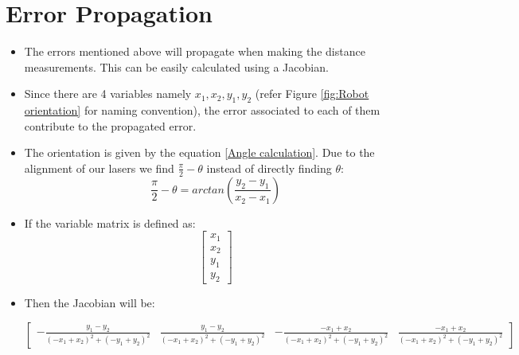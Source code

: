     \section{Error Propagation}
    {
        \begin{itemize}
            \item The errors mentioned above will propagate when making the distance measurements. This can be easily calculated using a Jacobian.
            
            \item Since there are 4 variables namely $x_1,x_2,y_1,y_2$ (refer Figure \ref{fig:Robot orientation} for naming convention), the error associated to each of them contribute to the propagated error.
            
            \item The orientation is given by the equation \ref{Angle calculation}. Due to the alignment of our lasers we find $\frac{\pi}{2}-\theta$ instead of directly finding $\theta$:
            \begin{equation}\label{Angle calculation}
                \frac{\pi}{2}-\theta=arctan(\frac{y_2-y_1}{x_2-x_1})
            \end{equation}
            
            \item If the variable matrix is defined as:
            \begin{equation}\label{Variable Matrix}
                \begin{bmatrix}x_{1}\\x_{2}\\y_{1}\\y_{2}\end{bmatrix}
            \end{equation}
            
            \item Then the Jacobian will be:
          
            
            
           $$ \begin{bmatrix}\label{Jacobian}- \frac{y_{1} - y_{2}}{\left(- x_{1} + x_{2}\right)^{2} + \left(- y_{1} + y_{2}\right)^{2}} & \frac{y_{1} - y_{2}}{\left(- x_{1} + x_{2}\right)^{2} + \left(- y_{1} + y_{2}\right)^{2}} & - \frac{- x_{1} + x_{2}}{\left(- x_{1} + x_{2}\right)^{2} + \left(- y_{1} + y_{2}\right)^{2}} & \frac{- x_{1} + x_{2}}{\left(- x_{1} + x_{2}\right)^{2} + \left(- y_{1} + y_{2}\right)^{2}}\end{bmatrix}
           $$
           

\end{itemize}}
